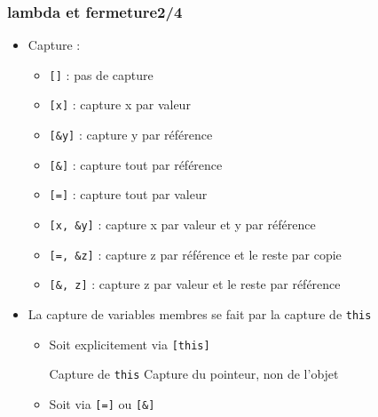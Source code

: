 \documentclass[C++.tex]{subfiles}
\begin{document}
\begin{frame}[fragile]
	\frametitle{lambda et fermeture\titlehfill{}2/4}
	\begin{itemize}
		\item Capture :
		\begin{itemize}
			\item{} \lstinline|[]| : pas de capture
			\item{} \lstinline|[x]| : capture x par valeur
			\item{} \lstinline|[&y]| : capture y par référence
			\item{} \lstinline|[&]| : capture tout par référence
			\item{} \lstinline|[=]|  : capture tout par valeur
			\item{} \lstinline|[x, &y]| : capture x par valeur et y par référence
			\item{} \lstinline|[=, &z]| : capture z par référence et le reste par copie
			\item{} \lstinline|[&, z]| : capture z par valeur et le reste par référence
		\end{itemize}

		\item La capture de variables membres se fait par la capture de  \lstinline|this|
		\begin{itemize}
			\item Soit explicitement via \lstinline|[this]|

			\begin{alertblock}{Capture de \lstinline|this|}
				Capture du pointeur, non de l'objet
	
			\end{alertblock}
			
			\item Soit via \lstinline|[=]| ou \lstinline|[&]|

		\end{itemize}
	\end{itemize}
\end{frame}
\end{document}
